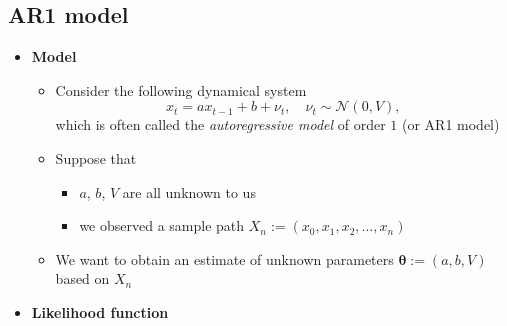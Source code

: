 \documentclass[12pt,a4paper]{article}
\begin{document}
\clearpage

\subsection{AR1 model}

\begin{itemize}
\item \textbf{Model}
  \begin{itemize}
  \item Consider the following dynamical system
    \begin{equation}\label{eq:model_ar1}%
      x_{t} = ax_{t-1} + b + \nu_{t},
      \quad \nu_{t} \sim \mathcal{N}(0,V),
    \end{equation}
    which is often called the \emph{autoregressive model} of order $1$ (or AR1 model)

  \item Suppose that
    \begin{itemize}
    \item $a$, $b$, $V$ are all unknown to us
    \item we observed a sample path $X_{n}:=(x_{0},x_{1},x_{2},\ldots, x_{n})$
    \end{itemize}
  \item We want to obtain an estimate of unknown parameters $\bm{\theta}:=(a, b, V)$ based on $X_{n}$
  \end{itemize}

\item \textbf{Likelihood function}
  \begin{itemize}


\end{itemize}
\end{itemize}
\end{document}
